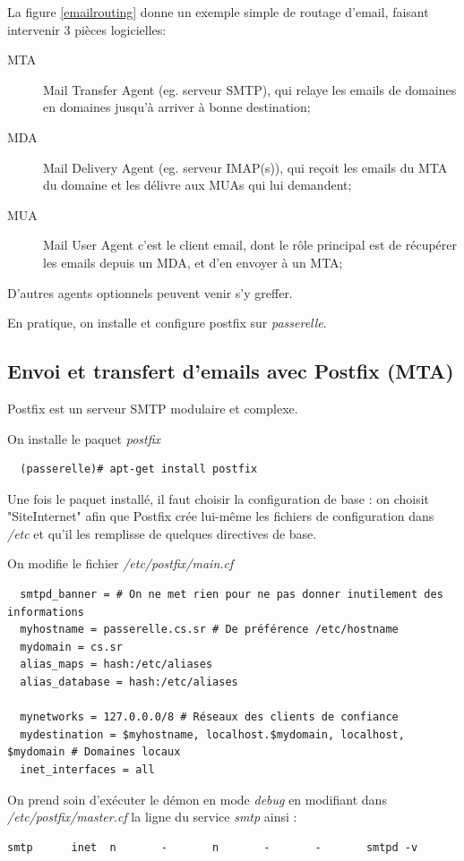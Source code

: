 \documentclass[a4paper]{article}
\begin{document}
La figure \ref{emailrouting} donne un exemple simple de routage d'email,
faisant intervenir $3$ pièces logicielles:
\begin{description}
	\item[MTA] Mail Transfer Agent (eg. serveur SMTP), qui relaye les
		emails de domaines en domaines jusqu'à arriver à bonne destination;
	\item[MDA] Mail Delivery Agent (eg. serveur IMAP(s)), qui reçoit les emails
		du MTA du domaine et les délivre aux MUAs qui lui demandent;
	\item[MUA] Mail User Agent c'est le client email, dont le rôle principal
		est de récupérer les emails depuis un MDA, et d'en envoyer à un MTA;
\end{description}
D'autres agents optionnels peuvent venir s'y greffer.

En pratique, on installe et configure postfix sur \textit{passerelle}.

\subsection{Envoi et transfert d'emails avec Postfix (MTA)}

Postfix est un serveur SMTP modulaire et complexe.

On installe le paquet \textit{postfix}
\begin{verbatim}
  (passerelle)# apt-get install postfix
\end{verbatim}

Une fois le paquet installé, il faut choisir la configuration de base : on choisit
"SiteInternet" afin que Postfix crée lui-même les fichiers de configuration
dans \textit{/etc} et qu'il les remplisse de quelques directives de base.

On modifie le fichier \textit{/etc/postfix/main.cf}
\begin{verbatim}
  smtpd_banner = # On ne met rien pour ne pas donner inutilement des informations
  myhostname = passerelle.cs.sr # De préférence /etc/hostname
  mydomain = cs.sr
  alias_maps = hash:/etc/aliases
  alias_database = hash:/etc/aliases

  mynetworks = 127.0.0.0/8 # Réseaux des clients de confiance
  mydestination = $myhostname, localhost.$mydomain, localhost, $mydomain # Domaines locaux
  inet_interfaces = all
\end{verbatim}

On prend soin d'exécuter le démon en mode \textit{debug} en modifiant 
dans \textit{/etc/postfix/master.cf} la ligne du service \textit{smtp} ainsi :
\begin{verbatim}
smtp      inet  n       -       n       -       -       smtpd -v
\end{verbatim}
\end{document}
